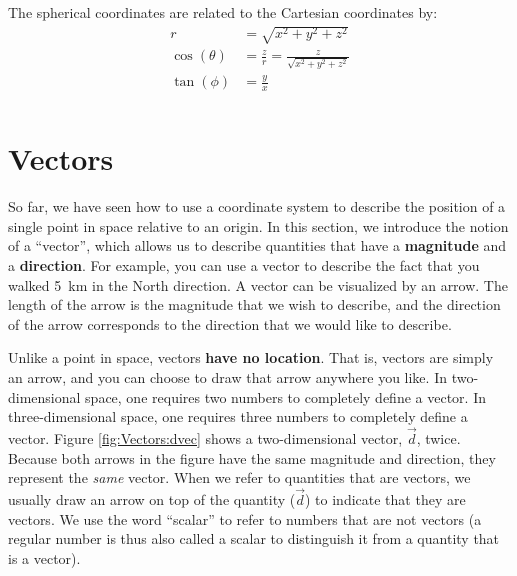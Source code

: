 
 The spherical coordinates are related to the Cartesian coordinates by:
\begin{align*}
r &= \sqrt{x^2+y^2+z^2}\\
\cos(\theta) &= \frac{z}{r}=\frac{z}{\sqrt{x^2+y^2+z^2}}\\
\tan(\phi) &= \frac{y}{x}\\
\end{align*}

\section{Vectors}
So far, we have seen how to use a coordinate system to describe the position of a single point in space relative to an origin. In this section, we introduce the notion of a ``vector'', which allows us to describe quantities that have a \textbf{magnitude} and a \textbf{direction}. For example, you can use a vector to describe the fact that you walked \SI{5}{km} in the North direction. A vector can be visualized by an arrow. The length of the arrow is the magnitude that we wish to describe, and the direction of the arrow corresponds to the direction that we would like to describe. 

Unlike a point in space, vectors \textbf{have no location}. That is, vectors are simply an arrow, and you can choose to draw that arrow anywhere you like. In two-dimensional space, one requires two numbers to completely define a vector. In three-dimensional space, one requires three numbers to completely define a vector. Figure \ref{fig:Vectors:dvec} shows a two-dimensional vector, $\vec d$, twice. Because both arrows in the figure have the same magnitude and direction, they represent the \textit{same} vector. When we refer to quantities that are vectors, we usually draw an arrow on top of the quantity ($\vec d$) to indicate that they are vectors. We use the word ``scalar'' to refer to numbers that are not vectors (a regular number is thus also called a scalar to distinguish it from a quantity that is a vector).


